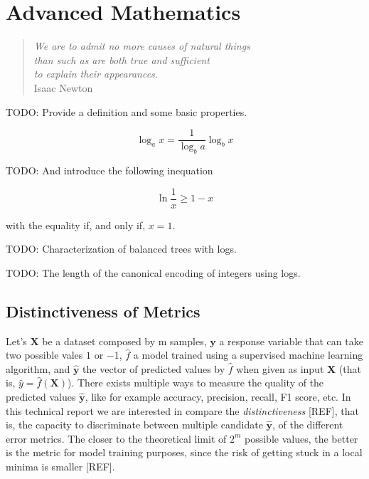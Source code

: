 %
%


\chapter{Advanced Mathematics}
\label{apx:math}

\begin{quote}
\begin{flushright}
\emph{We are to admit no more causes of natural things \\
than such as are both true and sufficient \\
to explain their appearances.}\\
Isaac Newton
\end{flushright}
\end{quote}
\bigskip

{\color{red} TODO: Provide a definition and some basic properties.}

\begin{equation}
\label{eq:change_base_logarithm}
\log_a x = \frac{1}{\log_b a} \log_b x
\end{equation}

{\color{red} TODO: And introduce the following inequation}

\begin{equation}
\label{eq:natural_logarithm_inequality}
\ln \frac{1}{x} \geq 1 - x
\end{equation}

with the equality if, and only if, $x=1$.

{\color{red} TODO: Characterization of balanced trees with logs.}

{\color{red} TODO: The length of the canonical encoding of integers using logs.}

\section{Distinctiveness of Metrics}

Let's $\mathbf{X}$ be a dataset composed by m samples, $\mathbf{y}$ a response variable that can take two possible vales $1$ or $-1$, $\hat{f}$ a model trained using a supervised machine learning algorithm, and $\hat{\mathbf{y}}$ the vector of predicted values by $\hat{f}$ when given as input $\mathbf{X}$ (that is, $\hat{y}=\hat{f}\left(\mathbf{X}\right)$). There exists multiple ways to measure the quality of the predicted values $\hat{\mathbf{y}}$, like for example accuracy, precision, recall, F1 score, etc. In this technical report we are interested in compare the \emph{distinctiveness} [REF], that is, the capacity to discriminate between multiple candidate $\hat{\mathbf{y}}$, of the different error metrics. The closer to the theoretical limit of $2^{m}$ possible values, the better is the metric for model training purposes, since the risk of getting stuck in a local minima is smaller [REF].

